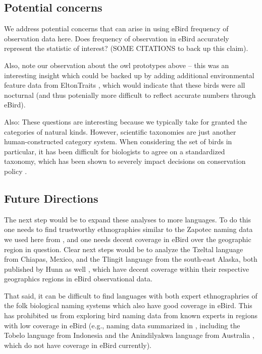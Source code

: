 \documentclass[10pt,letterpaper]{article}
\begin{document}
\subsection{Potential concerns}

We address potential concerns that can arise in using eBird frequency of observation data here. Does frequency of observation in eBird accurately represent the statistic of interest? (SOME CITATIONS to back up this claim). 

Also, note our observation about the owl prototypes above -- this was an interesting insight which could be backed up by adding additional environmental feature data from EltonTraits \cite{wilman2014eltontraits}, which would indicate that these birds were all nocturnal (and thus potenially more difficult to reflect accurate numbers through eBird).

Also: These questions are interesting because we typically take for granted the categories of natural kinds. However, scientific taxonomies are just another human-constructed category system. When considering the set of birds in particular, it has been difficult for biologists to agree on a standardized taxonomy, which has been shown to severely impact decisions on conservation policy \cite{peterson2006taxonomy,garnett2017taxonomy}.

\subsection{Future Directions}
The next step would be to expand these analyses to more languages. To do this one needs to find trustworthy ethnographies similar to the Zapotec naming data we used here from , and one needs decent coverage in eBird over the geographic region in question. Clear next steps would be to analyze the Tzeltal language from Chiapas, Mexico, and the Tlingit language from the south-east Alaska, both published by Hunn as well \cite{hunn1977tzeltal,hunn2012tlingit}, which have decent coverage within their respective geographics regions in eBird observational data. 

That said, it can be difficult to find languages with both expert ethnographries of the folk biological naming systems which also have good coverage in eBird. This has prohibited us from exploring bird naming data from known experts in regions with low coverage in eBird (e.g., naming data summarized in \cite{holman2002relation}, including the Tobelo language from Indonesia \cite{taylor1990folk} and the Anindilyakwa language from Australia \cite{waddy1988classification}, which do not have coverage in eBird currently).
\end{document}
